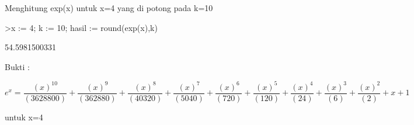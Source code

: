 \documentclass[a4paper,10pt]{article}
\begin{document}
\begin{eulernotebook}
\begin{eulercomment}
\begin{eulercomment}
\begin{eulercomment}
\begin{eulercomment}
\begin{eulercomment}
\begin{eulercomment}
\begin{eulercomment}
\begin{eulercomment}
\begin{eulercomment}
\begin{eulercomment}
\begin{eulercomment}
\begin{eulercomment}
\begin{eulercomment}
\begin{eulercomment}
\begin{eulercomment}
\begin{eulercomment}
\begin{eulercomment}
\begin{eulercomment}
\begin{eulercomment}
\begin{eulercomment}
\begin{eulercomment}
\begin{eulercomment}
\begin{eulercomment}
\begin{eulercomment}
\begin{eulercomment}
\begin{eulercomment}
\begin{eulercomment}
\begin{eulercomment}
\begin{eulercomment}
Menghitung exp(x) untuk x=4 yang di potong pada k=10
\end{eulercomment}
\begin{eulerprompt}
>x := 4; k := 10; hasil := round(exp(x),k)
\end{eulerprompt}
\begin{euleroutput}
  54.5981500331
\end{euleroutput}
\begin{eulercomment}
Bukti :

\end{eulercomment}
\begin{eulerformula}
\[
e^x = \frac{(x)^{10}}{(3628800)} + \frac{(x)^{9}}{(362880)} + \frac{(x)^{8}}{(40320)} + \frac{(x)^{7}}{(5040)} + \frac{(x)^{6}}{(720)} + \frac{(x)^{5}}{(120)} + \frac{(x)^{4}}{(24)} + \frac{(x)^{3}}{(6)} + \frac{(x)^{2}}{(2)} + x + 1
\]
\end{eulerformula}
\begin{eulercomment}
untuk x=4


\end{eulercomment}
\end{eulercomment}
\end{eulercomment}
\end{eulercomment}
\end{eulercomment}
\end{eulercomment}
\end{eulercomment}
\end{eulercomment}
\end{eulercomment}
\end{eulercomment}
\end{eulercomment}
\end{eulercomment}
\end{eulercomment}
\end{eulercomment}
\end{eulercomment}
\end{eulercomment}
\end{eulercomment}
\end{eulercomment}
\end{eulercomment}
\end{eulercomment}
\end{eulercomment}
\end{eulercomment}
\end{eulercomment}
\end{eulercomment}
\end{eulercomment}
\end{eulercomment}
\end{eulercomment}
\end{eulercomment}
\end{eulercomment}
\end{eulernotebook}
\end{document}
